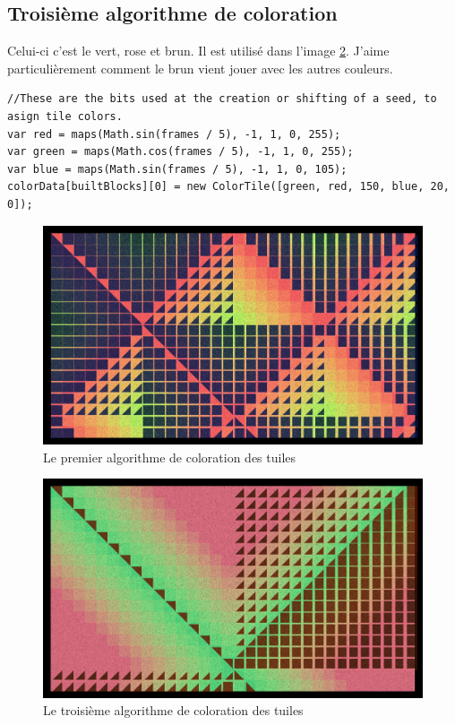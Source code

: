 \subsection{Troisième algorithme de coloration}
Celui-ci c'est le vert, rose et brun. Il est utilisé dans l'image \ref{thirdcoloralgorithm}. J'aime particulièrement comment le brun vient jouer avec les autres couleurs.
\begin{lstlisting}
//These are the bits used at the creation or shifting of a seed, to asign tile colors.
var red = maps(Math.sin(frames / 5), -1, 1, 0, 255);
var green = maps(Math.cos(frames / 5), -1, 1, 0, 255);
var blue = maps(Math.sin(frames / 5), -1, 1, 0, 105);
colorData[builtBlocks][0] = new ColorTile([green, red, 150, blue, 20, 0]);
\end{lstlisting}
\begin{figure}[h]
\includegraphics[width=1\textwidth]{images/pavage003.jpg}
\caption{Le premier algorithme de coloration des tuiles}
\label{thirdcoloralgorithm}
\end{figure}
\begin{figure}[h]
\includegraphics[width=1\textwidth]{images/pavage004.jpg}
\caption{Le troisième algorithme de coloration des tuiles}
\label{thirdcoloralgorithm}
\end{figure}

